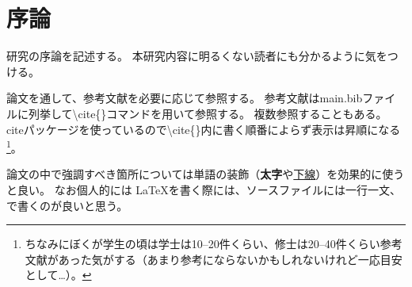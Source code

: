 \chapter{序論}\label{ch:introduction}

研究の序論を記述する。
本研究内容に明るくない読者にも分かるように気をつける。

論文を通して、参考文献を必要に応じて参照する\cite{bar:great2020coolname}。
参考文献はmain.bibファイルに列挙して{\textbackslash}cite\{\}コマンドを用いて参照する。
複数参照することもある\cite{bar:great2020coolname,garply:happy2021anothercoolname}。
citeパッケージを使っているので{\textbackslash}cite\{\}内に書く順番によらず表示は昇順になる\cite{garply:happy2021anothercoolname,bar:great2020coolname}\footnote{ちなみにぼくが学生の頃は学士は10--20件くらい、修士は20--40件くらい参考文献があった気がする（あまり参考にならないかもしれないけれど一応目安として…）。}。

論文の中で強調すべき箇所については単語の装飾（\textbf{太字}や\underline{下線}）を効果的に使うと良い。
なお個人的には \LaTeX を書く際には、ソースファイルには一行一文、で書くのが良いと思う。
